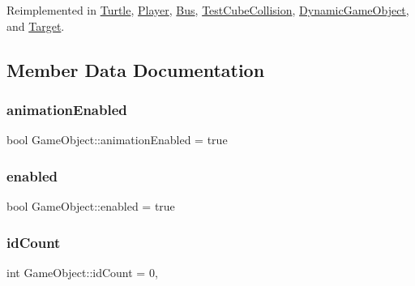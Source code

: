 Reimplemented in \hyperlink{class_turtle_a6d62e3f4e21f5ce3ffb4e7e2a8a9da1b}{Turtle}, \hyperlink{class_player_a51e705a6ad3628144e02832d1839b360}{Player}, \hyperlink{class_bus_ad07157ce2a50211ea599d040da7a4517}{Bus}, \hyperlink{class_test_cube_collision_ae528ac632377372d93964c938748fddf}{Test\+Cube\+Collision}, \hyperlink{class_dynamic_game_object_aaa505b57d131bbbce44d500ec2ca0e83}{Dynamic\+Game\+Object}, and \hyperlink{class_target_a5f3b2dc70e8065e53199ab3244059ba7}{Target}.



\subsection{Member Data Documentation}
\mbox{\label{class_game_object_a83e4944f434a732494fd3410ab2a0123}} 
\subsubsection{\texorpdfstring{animation\+Enabled}{animationEnabled}}
{\footnotesize\ttfamily bool Game\+Object\+::animation\+Enabled = true\hspace{0.3cm}{\ttfamily [protected]}}

\mbox{\label{class_game_object_a1ddc5fba8005a5269bfb282022f6f736}} 
\subsubsection{\texorpdfstring{enabled}{enabled}}
{\footnotesize\ttfamily bool Game\+Object\+::enabled = true\hspace{0.3cm}{\ttfamily [protected]}}

\mbox{\label{class_game_object_a3410079d3cfee94a22b5d6a885991165}} 
\subsubsection{\texorpdfstring{id\+Count}{idCount}}
{\footnotesize\ttfamily int Game\+Object\+::id\+Count = 0\hspace{0.3cm}{\ttfamily [static]}, {\ttfamily [protected]}}

